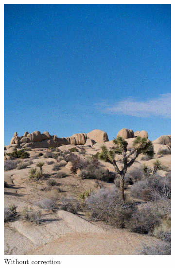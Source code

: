 \documentclass{article}
\begin{document}
\begin{figure}[htb]
\begin{subfigure}[b]{0.32\textwidth}
        \includegraphics[width=\textwidth]{../Result/Linear/linear-bsc-output.png}
        \caption{Without correction}
        \label{fig:image-linear-no-correction}
    \end{subfigure}
    \hfill
    \begin{subfigure}[b]{0.32\textwidth}
        \centering

\end{subfigure}
\end{figure}
\end{document}

